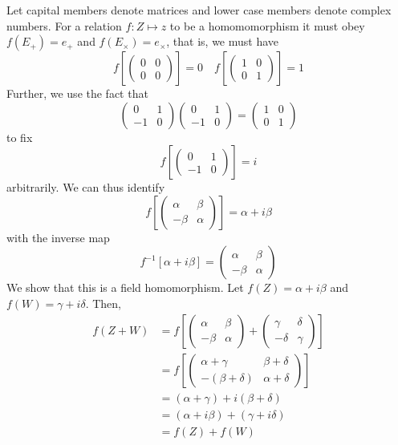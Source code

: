 \subsubsection{}
Let capital members denote matrices and lower case members denote complex numbers. For a relation \(f:Z\mapsto z\) to be a homomomorphism it must obey \(f(E_+) = e_+\) and \(f(E_\times) = e_\times\), that is, we must have
\[f\left[\begin{pmatrix}0&0\\0&0\end{pmatrix}\right] = 0\quad f\left[\begin{pmatrix}1&0\\0&1\end{pmatrix}\right] = 1\]
Further, we use the fact that
\[\begin{pmatrix}
	0&1\\-1&0
\end{pmatrix} \begin{pmatrix}
	0&1\\-1&0
\end{pmatrix} = \begin{pmatrix}
	1&0\\0&1
\end{pmatrix}\]
to fix 
\[f\left[ \begin{pmatrix}
		0&1\\-1&0
\end{pmatrix}\right]=i\]
arbitrarily. We can thus identify 
\[f\left[ \begin{pmatrix}
		\alpha &\beta\\-\beta&\alpha
\end{pmatrix}\right] = \alpha+i\beta\]
with the inverse map
\[f^{-1}[\alpha+i\beta] = \begin{pmatrix}
	\alpha & \beta \\ -\beta & \alpha
\end{pmatrix}\]
We show that this is a field homomorphism. Let \(f(Z) = \alpha+i\beta\) and \(f(W) = \gamma+i\delta\). Then,
\begin{align*}
	f(Z+W) &= f\left[ \begin{pmatrix}
		\alpha & \beta\\
		-\beta & \alpha
	\end{pmatrix}+ \begin{pmatrix}
		\gamma & \delta\\
		-\delta & \gamma
	\end{pmatrix}\right] \\
	&= f\left[ \begin{pmatrix}
		\alpha+\gamma & \beta + \delta \\
		-(\beta + \delta) & \alpha + \delta
	\end{pmatrix}\right]\\
	&= (\alpha+\gamma)+i(\beta+\delta) \\
	&= (\alpha+i\beta)+(\gamma+i\delta) \\
	&= f(Z)+f(W)
\end{align*}
